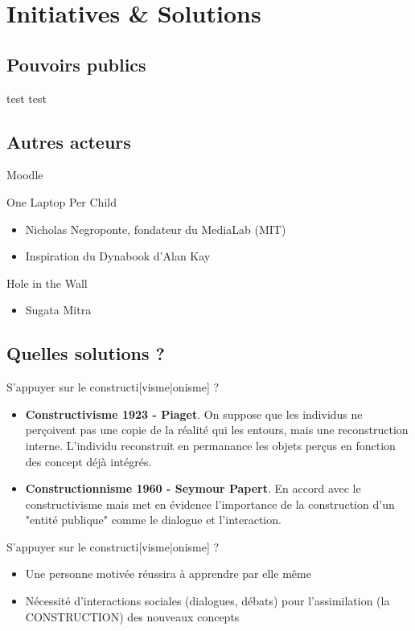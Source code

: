 \section{Initiatives \& Solutions}

\subsection{Pouvoirs publics}

\begin{frame}{test}
test
\end{frame}

\subsection{Autres acteurs}

\begin{frame}{Moodle}
\end{frame}

\begin{frame}{One Laptop Per Child}
  \begin{itemize}
   \item Nicholas  Negroponte, fondateur du MediaLab (MIT)
   \item Inspiration du Dynabook d'Alan Kay
  \end{itemize}
\end{frame}

\begin{frame}{Hole in the Wall}
  \begin{itemize}
    \item Sugata Mitra  
  \end{itemize}
\end{frame}

\subsection{Quelles solutions ?}

\begin{frame}{S'appuyer sur le constructi[visme|onisme] ?}
\begin{itemize}
  \item \textbf{Constructivisme 1923 - Piaget}. On suppose que les individus ne perçoivent pas une copie de la réalité qui les entours, mais une reconstruction interne. L'individu reconstruit en permanance les objets perçus en fonction des concept déjà intégrés.
  \item \textbf{Constructionnisme 1960 - Seymour Papert}. En accord avec le constructivisme mais met en évidence l'importance de la construction d'un "entité publique" comme le dialogue et l'interaction.
\end{itemize}
\end{frame}

\begin{frame}{S'appuyer sur le constructi[visme|onisme] ?}
\begin{itemize}
  \item Une personne motivée réussira à apprendre par elle même
  \item Nécessité d'interactions sociales (dialogues, débats) pour l'assimilation (la CONSTRUCTION) des nouveaux concepts
\end{itemize}
\end{frame}